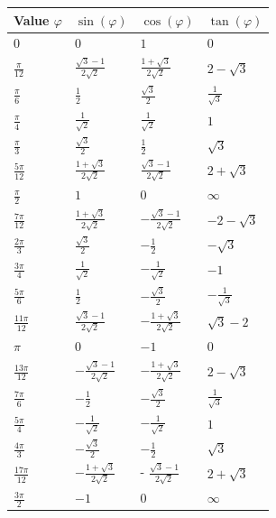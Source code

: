 \documentclass[25pt]{sciposter}
\begin{document}
\begin{multicols}{3}
\begin{center}
	\begin{tabular}{ p{5cm} | p{5cm}  | p{5cm} | p{5cm}  }
		Value $\varphi$ & $\sin(\varphi)$ & $\cos(\varphi)$ & $\tan(\varphi)$ \\[0.75ex] \hline \hline 
		$0$ & $0$ & $1$ & $0$ \\  \hline
		$\frac{\pi}{12}$ & $\frac{\sqrt{3} -1}{2\sqrt{2}}$ & $\frac{1 + \sqrt{3}}{2\sqrt{2}}$ & $2 - \sqrt{3}$ \\ \hline
		$\frac{\pi}{6}$ & $\frac{1}{2}$ & $\frac{\sqrt{3}}{2}$ & $\frac{1}{\sqrt{3}}$	\\  \hline
		$\frac{\pi}{4}$ & $\frac{1}{\sqrt{2}}$ & $\frac{1}{\sqrt{2}}$ & $1$ \\  \hline
		$\frac{\pi}{3}$ & $\frac{\sqrt{3}}{2}$ & $\frac{1}{2}$ & $\sqrt{3}$\\  \hline
		$\frac{5\pi}{12}$ & $\frac{1 + \sqrt{3}}{2\sqrt{2}}$ & $\frac{\sqrt{3} - 1}{2\sqrt{2}}$ & $2 + \sqrt{3}$\\  \hline
		$\frac{\pi}{2}$ & $1$ & $0$ & $\infty$\\\hline
		$\frac{7\pi}{12}$ & $\frac{1+\sqrt{3}}{2\sqrt{2}}$ & $ -\frac{\sqrt{3}-1}{2\sqrt{2}}$ & $-2-\sqrt{3}$\\  \hline
		$\frac{2\pi}{3}$ & $\frac{\sqrt{3}}{2}$ & $- \frac{1}{2}$ & $-\sqrt{3}$\\ \hline
		$\frac{3\pi}{4}$ & $\frac{1}{\sqrt{2}}$ & $-\frac{1}{\sqrt{2}}$ & $-1$\\  \hline
		$\frac{5\pi}{6}$ & $\frac{1}{2}$ & $- \frac{\sqrt{3}}{2}$ & $- \frac{1}{\sqrt{3}}$ \\ \hline
		$\frac{11\pi}{12}$ & $\frac{\sqrt{3} -1}{2\sqrt{2}}$ & $-\frac{1+\sqrt{3}}{2\sqrt{2}}$ & $\sqrt{3} -2$\\ \hline
		$\pi$ & $0$ & $-1$ & $0$ \\ \hline
		$\frac{13\pi}{12}$ & $-\frac{\sqrt{3} -1}{2\sqrt{2}}$ & $- \frac{1 + \sqrt{3}}{2\sqrt{2}}$ & $2 - \sqrt{3}$\\ \hline
		$\frac{7\pi}{6}$ & $-\frac{1}{2}$ & $-\frac{\sqrt{3}}{2}$ & $\frac{1}{\sqrt{3}}$\\ \hline
		$\frac{5\pi}{4}$ & $-\frac{1}{\sqrt{2}}$ & $-\frac{1}{\sqrt{2}}$ & $1$ \\ \hline
		$\frac{4 \pi}{3}$ & $- \frac{\sqrt{3}}{2}$ & $-\frac{1}{2}$ & $\sqrt{3}$\\  \hline
		$\frac{17\pi}{12}$ & $-\frac{1+\sqrt{3}}{2\sqrt{2}}$ & - $\frac{\sqrt{3}-1}{2\sqrt{2}}$ & $2+ \sqrt{3}$\\ \hline
		$\frac{3\pi}{2}$ & $-1$ & $0$ & $\infty$ \\ \hline

\end{tabular}
\end{center}
\end{multicols}
\end{document}
